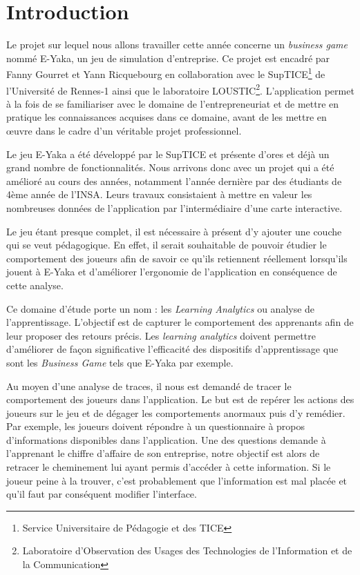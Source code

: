 \chapter*{Introduction}

	Le projet sur lequel nous allons travailler cette année concerne un \emph{business game} nommé E-Yaka, un jeu de simulation d’entreprise. Ce projet est encadré par Fanny Gourret et Yann Ricquebourg en collaboration avec le SupTICE\footnote{Service Universitaire de Pédagogie et des TICE} de l’Université de Rennes-1 ainsi que le laboratoire LOUSTIC\footnote{Laboratoire d'Observation des Usages des Technologies de l'Information et de la Communication}. L’application permet à la fois de se familiariser avec le domaine de l'entrepreneuriat et de mettre en pratique les connaissances acquises dans ce domaine, avant de les mettre en œuvre dans le cadre d’un véritable projet professionnel.

	Le jeu E-Yaka a été développé par le SupTICE et présente d’ores et déjà un grand nombre de fonctionnalités. Nous arrivons donc avec un projet qui a été amélioré au cours des années, notamment l’année dernière par des étudiants de 4ème année de l’INSA. Leurs travaux consistaient à mettre en valeur les nombreuses données de l’application par l'intermédiaire d’une carte interactive.

	Le jeu étant presque complet, il est nécessaire à présent d’y ajouter une couche qui se veut pédagogique. En effet, il serait souhaitable de pouvoir étudier le comportement des joueurs afin de savoir ce qu’ils retiennent réellement lorsqu’ils jouent à E-Yaka et d’améliorer l’ergonomie de l’application en conséquence de cette analyse.

	Ce domaine d’étude porte un nom : les \emph{Learning Analytics} ou analyse de l’apprentissage. L’objectif est de capturer le comportement des apprenants afin de leur proposer des retours précis. Les \emph{learning analytics} doivent permettre d’améliorer de façon significative l’efficacité des dispositifs d’apprentissage que sont les \emph{Business Game} tels que E-Yaka par exemple.

	Au moyen d’une analyse de traces, il nous est demandé de tracer le comportement des joueurs dans l’application. Le but est de repérer les actions des joueurs sur le jeu et de dégager les comportements anormaux puis d’y remédier. Par exemple, les joueurs doivent répondre à un questionnaire à propos d’informations disponibles dans l’application. Une des questions demande à l'apprenant le chiffre d’affaire de son entreprise, notre objectif est alors de retracer le cheminement lui ayant permis d’accéder à cette information. Si le joueur peine à la trouver, c’est probablement que l’information est mal placée et qu’il faut par conséquent modifier l’interface. 

